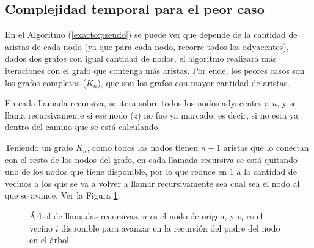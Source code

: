 \subsection{Complejidad temporal para el peor caso} \label{exacto:complejidad}

En el Algoritmo (\ref{exacto:pseudo}) se puede ver que depende de la cantidad de aristas de cada nodo (ya que para cada nodo, recorre todos los adyacentes), dados dos grafos
con igual cantidad de nodos, el algoritmo realizar\'a m\'as iteraciones con el grafo que contenga m\'as aristas. Por ende, los peores casos son los grafos completos ($K_n$),
que son los grafos con mayor cantidad de aristas.

En cada llamada recursiva, se itera sobre todos los nodos adyacentes a $u$, y se llama recursivamente si ese nodo ($z$) no fue ya marcado, es decir, si no esta ya dentro del camino que se est\'a calculando.

Teniendo un grafo $K_n$, como todos los nodos tienen $n - 1$ aristas que lo conectan con el resto de los nodos del grafo, en cada llamada recursiva se est\'a quitando uno de los nodos que tiene disponible, por lo que reduce en 1 a la cantidad de vecinos a los que se va a volver a llamar recursivamente sea cual sea el nodo al que se avance. Ver la Figura \ref{exacto:arbol_llamadas}.

\begin{figure}[htbp]
\centering
{}

\caption{\'Arbol de llamadas recursivas. $u$ es el nodo de origen, y $v_i$ es el vecino $i$ disponible para avanzar en la recursi\'on del padre del nodo en el \'arbol}
\label{exacto:arbol_llamadas}
\end{figure}

